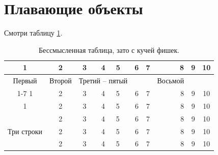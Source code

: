 \documentclass[a4paper,12pt]{article}
\begin{document}
\section{Плавающие объекты}

Смотри таблицу \ref{tab:mytab}.

\begin{table}[!h]
	\begin{center}
		\caption[Заголовок для списка таблиц]{Бессмысленная таблица, зато с кучей фишек.}\label{tab:mytab}
		\begin{tabular}{|c|c|c|c||l|c|c|r|c|c|}
  		\hline
    	1 & 2 & 3 & 4 & 5 & 6 & 7 & 8 & 9 & 10 \\ \hline
  		Первый & Второй & \multicolumn{3}{|c|}{Третий -- пятый} &   &  & Восьмой &   &  \\ 
		\cline{1-7} \cline{9-10}
   		1 & 2 & 3 & 4 & 5 & 6 & 7 & 8 & 9 & 10 \\ \hline \hline
   		1 & 2 & 3 & 4 & 5 & 6 & 7 & 8 & 9 & 10 \\ \hline
    	\multirow{3}{*}{Три строки}  & 2 & 3 & 4 & 5 & 6 & 7 & 8 & 9 & 10 \\ \cline{2-10}
    	  & 2 & 3 & 4 & 5 & 6 & 7 & 8 & 9 & 10 \\ \cline{2-10}
    	  & 2 & 3 & 4 & 5 & 6 & 7 & 8 & 9 & 10 \\ \hline
		\end{tabular}
	\end{center}
\end{table}
\end{document}
